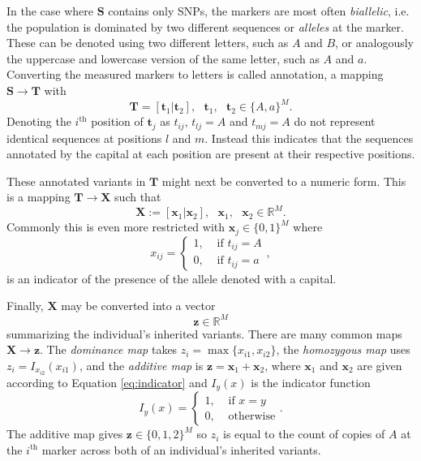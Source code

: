 \documentclass[12pt]{article}
\newcommand{\ve}[1]{\mathbf{#1}}           %
\newcommand{\m}[1]{\mathbf{#1}}               %
\newcommand{\ind}[2]{I_{#2} \left( #1 \right)}
\newcommand{\field}[1]{\mathbb{#1}}
\newcommand{\Reals}{\field{R}}
\begin{document}
In the case where $\m{S}$ contains only SNPs, the markers are most often \textit{biallelic}, i.e. the population is dominated by two different sequences or \textit{alleles} at the marker. These can be denoted using two different letters, such as $A$ and $B$, or analogously the uppercase and lowercase version of the same letter, such as $A$ and $a$. Converting the measured markers to letters is called annotation, a mapping $\m{S} \rightarrow \m{T}$ with
$$\m{T} = [\ve{t}_1 | \ve{t}_2], \text{ } \ve{t}_1, \text{ } \ve{t}_2 \in \{A,a\}^M.$$
Denoting the $i^{\text{th}}$ position of $\ve{t}_j$ as $t_{ij}$, $t_{lj} = A$ and $t_{mj} = A$ do not represent identical sequences at positions $l$ and $m$. Instead this indicates that the sequences annotated by the capital at each position are present at their respective positions.

These annotated variants in $\m{T}$ might next be converted to a numeric form. This is a mapping $\m{T} \rightarrow \m{X}$ such that
$$\m{X} := [\ve{x}_1 | \ve{x}_2], \text{ } \ve{x}_1, \text{ } \ve{x}_2 \in \Reals^M.$$
Commonly this is even more restricted with $\ve{x}_j \in \{0,1\}^M$ where
\begin{equation} \label{eq:indicator}
x_{ij} = \begin{cases}
  1, & \text{ if } t_{ij} = A \\
  0, & \text{ if } t_{ij} = a
\end{cases},
\end{equation}
is an indicator of the presence of the allele denoted with a capital.

Finally, $\m{X}$ may be converted into a vector
$$\ve{z} \in \Reals^M$$
summarizing the individual's inherited variants. There are many common maps $\m{X} \rightarrow \ve{z}$. The \textit{dominance map} takes $z_i = \max\{x_{i1}, x_{i2}\}$, the \textit{homozygous map} uses $z_i = \ind{x_{i1}}{x_{i2}}$, and the \textit{additive map} is $\ve{z} = \ve{x}_1 + \ve{x}_2$, where $\ve{x}_1$ and $\ve{x}_2$ are given according to Equation \ref{eq:indicator} and $\ind{x}{y}$ is the indicator function
\begin{equation*}\ind{x}{y} = \begin{cases}
  1, & \text{ if } x = y \\
  0, & \text{ otherwise}
\end{cases}.\end{equation*} The additive map gives $\ve{z} \in \{0,1,2\}^M$ so $z_i$ is equal to the count of copies of $A$ at the $i^{\text{th}}$ marker across both of an individual's inherited variants.
\end{document}
